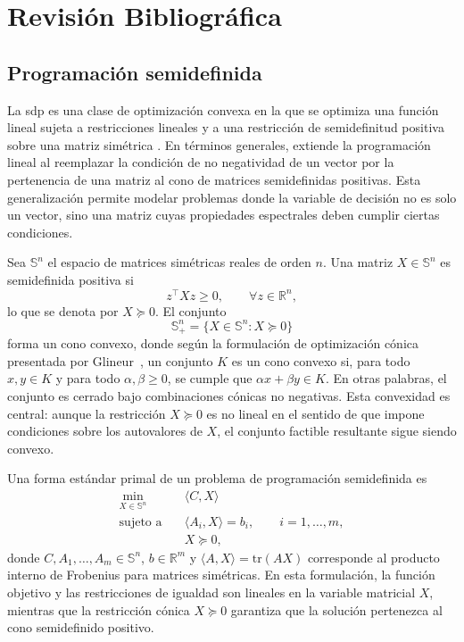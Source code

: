 \chapter{Revisión Bibliográfica}
\label{ch:litRev}


\section{Programación semidefinida}
\label{sec:programacion_semidefinida}

La \acrfull{sdp} es una clase de optimización convexa en la que se optimiza una función
lineal sujeta a restricciones lineales y a una restricción de semidefinitud positiva sobre
una matriz simétrica \cite{vandenbergheSemidefiniteProgramming1996}. En términos generales,
extiende la programación lineal al reemplazar la condición de no negatividad de un vector
por la pertenencia de una matriz al cono de matrices semidefinidas positivas. Esta generalización
permite modelar problemas donde la variable de decisión no es solo un vector, sino una matriz
cuyas propiedades espectrales deben cumplir ciertas condiciones.

Sea $\mathbb{S}^n$ el espacio de matrices simétricas reales de orden $n$. Una matriz
$X\in\mathbb{S}^n$ es semidefinida positiva si
\[
    z^\top X z \geq 0, \qquad \forall z\in\mathbb{R}^n,
\]
lo que se denota por $X\succeq 0$. El conjunto
\[
    \mathbb{S}_+^n=\{X\in\mathbb{S}^n: X\succeq 0\}
\]
forma un cono convexo, donde según la formulación de optimización cónica presentada por
Glineur~\cite{glineurConicOptimizationElegant2001}, un conjunto $K$ es un cono convexo si,
para todo $x,y\in K$ y para todo $\alpha,\beta\geq 0$, se cumple que
$\alpha x+\beta y\in K$. En otras palabras, el conjunto es cerrado bajo combinaciones
cónicas no negativas. Esta convexidad es central: aunque la restricción $X\succeq 0$ es
no lineal en el sentido de que impone condiciones sobre los autovalores de $X$, el conjunto
factible resultante sigue siendo convexo.

Una forma estándar primal de un problema de programación semidefinida es
\[
\begin{aligned}
    \min_{X\in\mathbb{S}^n}\quad & \langle C,X\rangle \\
    \text{sujeto a}\quad & \langle A_i,X\rangle = b_i,
        \qquad i=1,\ldots,m,\\
    & X\succeq 0,
\end{aligned}
\]
donde $C,A_1,\ldots,A_m\in\mathbb{S}^n$, $b\in\mathbb{R}^m$ y
$\langle A,X\rangle=\mathrm{tr}(AX)$ corresponde al producto interno de Frobenius para
matrices simétricas. En esta formulación, la función objetivo y las restricciones de igualdad
son lineales en la variable matricial $X$, mientras que la restricción cónica $X\succeq 0$
garantiza que la solución pertenezca al cono semidefinido positivo.


